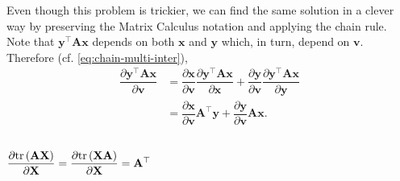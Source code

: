 \documentclass{article}
\newcommand{\trans}{\top}
\begin{document}
Even though this problem is trickier, we can find the same solution in a clever way by preserving the Matrix Calculus notation and applying the chain rule. Note that \(\mathbf{y}^\trans \mathbf{A} \mathbf{x}\) depends on both \(\mathbf{x}\) and \(\mathbf{y}\) which, in turn, depend on \(\mathbf{v}\). Therefore (cf. \eqref{eq:chain-multi-inter}),
\begin{align}
    \dfrac{\partial \mathbf{y}^\trans \mathbf{A} \mathbf{x}}{\partial \mathbf{v}} & = \dfrac{\partial \mathbf{x}}{\partial \mathbf{v}} \dfrac{\partial \mathbf{y}^\trans \mathbf{A} \mathbf{x}}{\partial \mathbf{x}} + \dfrac{\partial \mathbf{y}}{\partial \mathbf{v}} \dfrac{\partial \mathbf{y}^\trans \mathbf{A} \mathbf{x}}{\partial \mathbf{y}} \\
    & = \dfrac{\partial \mathbf{x}}{\partial \mathbf{v}} \mathbf{A}^{\trans} \mathbf{y} + \dfrac{\partial \mathbf{y}}{\partial \mathbf{v}} \mathbf{A} \mathbf{x}.
\end{align}

\subsection{\(\dfrac{\partial \textnormal{tr}\left(\mathbf{A} \mathbf{X}\right)}{\partial \mathbf{X}} = \dfrac{\partial \textnormal{tr}\left(\mathbf{X} \mathbf{A}\right)}{\partial \mathbf{X}} = \mathbf{A}^\trans\)}
\end{document}
